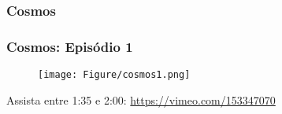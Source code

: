 \documentclass[pdf,9pt,xcolor=dvipsnames,hide notes]{beamer}\usepackage[]{graphicx}\usepackage[]{color}
\begin{document}
\subsubsection{Cosmos}
\begin{frame}\frametitle{Cosmos: Episódio 1} 
\begin{figure}[hb]
    \texttt{[image: Figure/cosmos1.png]}
  \end{figure}
  Assista entre 1:35 e 2:00: \url{https://vimeo.com/153347070}
\end{frame}


% 
\end{document}
